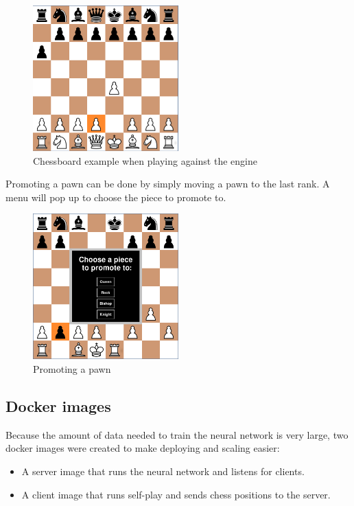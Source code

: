 \documentclass{article}
\begin{document}
\begin{figure}[H]
    \centering
    \includegraphics[width=0.5\textwidth]{img/chessboard-gui.png}
    \caption{Chessboard example when playing against the engine}
\end{figure}

Promoting a pawn can be done by simply moving a pawn to the last rank. A menu will pop up 
to choose the piece to promote to.

\begin{figure}[H]
    \centering
    \includegraphics[width=0.5\textwidth]{img/chessboard-promotion.png}
    \caption{Promoting a pawn}
\end{figure}

\subsection{Docker images}

Because the amount of data needed to train the neural network is very large, two docker images were created to make deploying and scaling easier:

\begin{itemize}
    \item A server image that runs the neural network and listens for clients.
    \item A client image that runs self-play and sends chess positions to the server.
\end{itemize}
\end{document}
